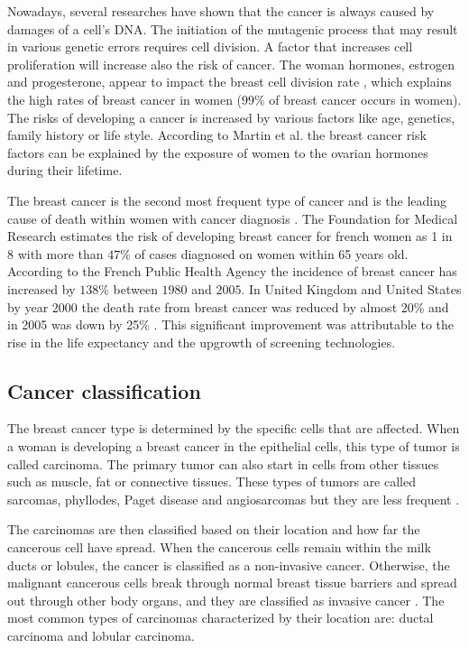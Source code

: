 Nowadays, several researches \citep{pike_estrogens_1993,martin_webmd_2017} have shown that the cancer is always caused by damages of a cell's DNA. The initiation of the mutagenic process that may result in various genetic errors requires cell division.  A factor that increases cell proliferation will increase also the risk of cancer. The woman hormones, estrogen and progesterone, appear to impact the breast cell division rate \citep{ciocca_estrogen_1997,fanelli_estrogen_1996},  which explains the high rates of breast cancer in women ($99\%$ of breast cancer occurs in women). The risks of developing a cancer is increased by various factors like age, genetics, family history or life style. According to Martin et al. \citep{martin_webmd_2017} the breast cancer risk factors can be explained by the exposure of women to the ovarian hormones during their lifetime.

The breast cancer is the second most frequent type of cancer and is the leading cause of death within women with cancer diagnosis \citep{spf_chiffres_2017}.  The Foundation for Medical Research \citep{frm_chiffres_2017} estimates the risk of developing breast cancer for french women as 1 in 8 with more than $47\%$ of cases diagnosed on women within 65 years old.
According to the French Public Health Agency \citep{spf_chiffres_2017} the incidence of breast cancer has increased by $138\% $ between $1980$ and $2005$. In United Kingdom and United States by year 2000 the death rate from breast cancer was reduced by almost 20\% and in 2005 was down by 25\% \citep{peto_uk_2000}. This significant improvement was attributable to the rise in the life expectancy and the upgrowth of screening technologies.


\subsection{Cancer classification }\label{subsection:breastcancerclasification}
The breast cancer type is determined by the specific cells that are affected. 
When a woman is developing a breast cancer in the epithelial cells, this type of tumor is called carcinoma. The primary tumor can also start in cells from other tissues such as muscle, fat or connective tissues. These types of tumors are called sarcomas, phyllodes, Paget disease and angiosarcomas but they are less frequent \citep{acs_cancer_2017}. 

The carcinomas are then classified based on their location and how far the cancerous cell have spread. When the cancerous cells remain within the milk ducts or lobules, the cancer is classified as a non-invasive cancer. Otherwise, the malignant cancerous cells break through normal breast tissue barriers and spread out through other body organs, and they are classified as invasive cancer \citep{andolina2011mammographic}. The most common types of carcinomas characterized by their location are: ductal carcinoma and lobular carcinoma. 

